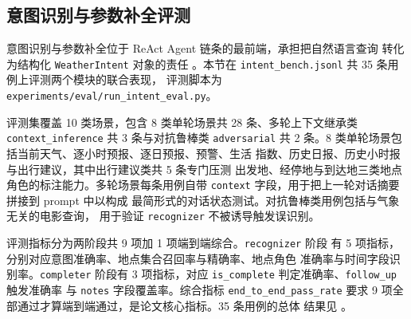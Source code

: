 ﻿%

\subsection{意图识别与参数补全评测}
\label{sec:intent-eval}

意图识别与参数补全位于 ReAct Agent 链条的最前端，承担把自然语言查询
转化为结构化 \texttt{WeatherIntent} 对象的责任 \cite{ref18}。本节在
\texttt{intent\_\bk{}bench.\bk{}jsonl} 共 35 条用例上评测两个模块的联合表现，
评测脚本为 \texttt{experiments/\bk{}eval/\bk{}run\_\bk{}intent\_\bk{}eval.\bk{}py}。

评测集覆盖 10 类场景，包含 8 类单轮场景共 28 条、多轮上下文继承类
\texttt{context\_\bk{}inference} 共 3 条与对抗鲁棒类 \texttt{adversarial}
共 2 条。8 类单轮场景包括当前天气、逐小时预报、逐日预报、预警、生活
指数、历史日报、历史小时报与出行建议，其中出行建议类共 5 条专门压测
出发地、经停地与到达地三类地点角色的标注能力。多轮场景每条用例自带
\texttt{context} 字段，用于把上一轮对话摘要拼接到 prompt 中以构成
最简形式的对话状态测试。对抗鲁棒类用例包括与气象无关的电影查询，
用于验证 \texttt{recognizer} 不被诱导触发误识别。

评测指标分为两阶段共 9 项加 1 项端到端综合。\texttt{recognizer} 阶段
有 5 项指标，分别对应意图准确率、地点集合召回率与精确率、地点角色
准确率与时间字段识别率。\texttt{completer} 阶段有 3 项指标，对应
\texttt{is\_\bk{}complete} 判定准确率、\texttt{follow\_\bk{}up} 触发准确率
与 \texttt{notes} 字段覆盖率。综合指标 \texttt{end\_\bk{}to\_\bk{}end\_\bk{}pass\_\bk{}rate}
要求 9 项全部通过才算端到端通过，是论文核心指标。35 条用例的总体
结果见 。

